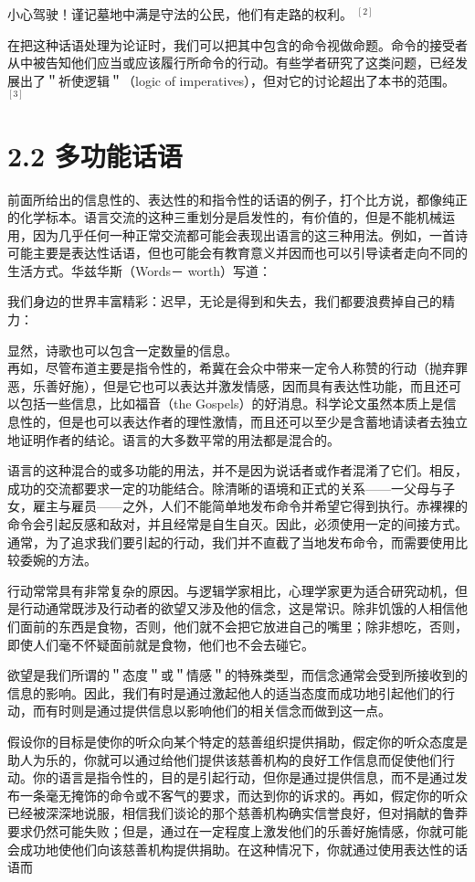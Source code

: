 \begin{displayquote}
小心驾驶！谨记墓地中满是守法的公民，他们有走路的权利。 ${ }^{[2]}$
\end{displayquote}

在把这种话语处理为论证时，我们可以把其中包含的命令视做命题。命令的接受者从中被告知他们应当或应该履行所命令的行动。有些学者研究了这类问题，已经发展出了＂祈使逻辑＂（logic of imperatives），但对它的讨论超出了本书的范围。 ${ }^{[3]}$

\section*{2.2 多功能话语}
前面所给出的信息性的、表达性的和指令性的话语的例子，打个比方说，都像纯正的化学标本。语言交流的这种三重划分是启发性的，有价值的，但是不能机械运用，因为几乎任何一种正常交流都可能会表现出语言的这三种用法。例如，一首诗可能主要是表达性话语，但也可能会有教育意义并因而也可以引导读者走向不同的生活方式。华兹华斯（Words－ worth）写道：

我们身边的世界丰富精彩：迟早，无论是得到和失去，我们都要浪费掉自己的精力：

显然，诗歌也可以包含一定数量的信息。\\
再如，尽管布道主要是指令性的，希冀在会众中带来一定令人称赞的行动（抛弃罪恶，乐善好施），但是它也可以表达并激发情感，因而具有表达性功能，而且还可以包括一些信息，比如福音（the Gospels）的好消息。科学论文虽然本质上是信息性的，但是也可以表达作者的理性激情，而且还可以至少是含蓄地请读者去独立地证明作者的结论。语言的大多数平常的用法都是混合的。

语言的这种混合的或多功能的用法，并不是因为说话者或作者混淆了它们。相反，成功的交流都要求一定的功能结合。除清晰的语境和正式的关系——一父母与子女，雇主与雇员——之外，人们不能简单地发布命令并希望它得到执行。赤裸裸的命令会引起反感和敌对，并且经常是自生自灭。因此，必须使用一定的间接方式。通常，为了追求我们要引起的行动，我们并不直截了当地发布命令，而需要使用比较委婉的方法。

行动常常具有非常复杂的原因。与逻辑学家相比，心理学家更为适合研究动机，但是行动通常既涉及行动者的欲望又涉及他的信念，这是常识。除非饥饿的人相信他们面前的东西是食物，否则，他们就不会把它放进自己的嘴里；除非想吃，否则，即使人们毫不怀疑面前就是食物，他们也不会去碰它。

欲望是我们所谓的＂态度＂或＂情感＂的特殊类型，而信念通常会受到所接收到的信息的影响。因此，我们有时是通过激起他人的适当态度而成功地引起他们的行动，而有时则是通过提供信息以影响他们的相关信念而做到这一点。

假设你的目标是使你的听众向某个特定的慈善组织提供捐助，假定你的听众态度是助人为乐的，你就可以通过给他们提供该慈善机构的良好工作信息而促使他们行动。你的语言是指令性的，目的是引起行动，但你是通过提供信息，而不是通过发布一条毫无掩饰的命令或不客气的要求，而达到你的诉求的。再如，假定你的听众已经被深深地说服，相信我们谈论的那个慈善机构确实信誉良好，但对捐献的鲁莽要求仍然可能失败；但是，通过在一定程度上激发他们的乐善好施情感，你就可能会成功地使他们向该慈善机构提供捐助。在这种情况下，你就通过使用表达性的话语而


